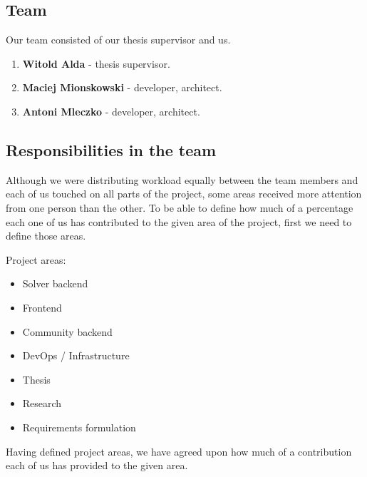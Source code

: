 \subsection{Team}

Our team consisted of our thesis supervisor and us.

\begin{enumerate}
	\item \textbf{Witold Alda} - thesis supervisor.
	\item \textbf{Maciej Mionskowski} - developer, architect.
	\item \textbf{Antoni Mleczko} - developer, architect.
\end{enumerate}

\subsection{Responsibilities in the team}

Although we were distributing workload equally between the team members
and each of us touched on all parts of the project, some areas 
received more attention from one person than the other.
To be able to define how much of a percentage each one of us has contributed to the 
given area of the project, first we need to define those areas.
\smallskip

Project areas:
\begin{itemize}
	\item Solver backend
	\item Frontend
	\item Community backend
	\item DevOps / Infrastructure
	\item Thesis
	\item Research
	\item Requirements formulation
\end{itemize}

Having defined project areas, we have agreed upon how much of a contribution each of
us has provided to the given area.

